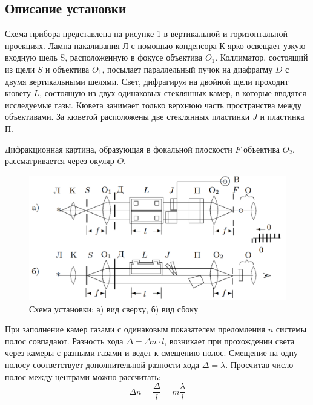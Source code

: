 \documentclass[a4paper,12pt]{article}
\begin{document}
	\subsection{Описание установки}
	Схема прибора представлена на рисунке 1 в вертикальной и горизонтальной проекциях. Лампа накаливания Л с помощью конденсора К ярко освещает узкую входную щель S, расположенную в фокусе объектива $O_1$. Коллиматор, состоящий из щели $S$ и объектива $O_1$, посылает параллельный пучок на диафрагму $D$ с двумя вертикальными щелями. Свет, дифрагируя на двойной щели проходит кювету $L$, состоящую из двух одинаковых стеклянных камер, в которые вводятся исследуемые газы. Кювета занимает только верхнюю часть пространства между объективами. За кюветой расположены две стеклянных пластинки $J$ и пластинка П. 
	
	Дифракционная картина, образующая в фокальной плоскости $F$ объектива $O_2$, рассматривается через окуляр $O$.
	
	\begin{figure}[h!]
		\begin{center}
			\includegraphics[width = \linewidth]{expsc}
			\caption{Схема установки: а) вид сверху, б) вид сбоку}
		\end{center}
	\end{figure}
	
	При заполнение камер газами с одинаковым показателем преломления $n$ системы полос совпадают. Разность хода $\Delta = \Delta n \cdot l$, возникает при прохождении света через камеры с разными газами и ведет к смещению полос. Смещение на одну полосу соответствует дополнительной разности хода $\Delta = \lambda$. Просчитав число полос между центрами можно рассчитать:
	\begin{equation}
	\Delta n = \frac{\Delta}{l} = m\frac{\lambda}{l}
	\end{equation}
	
\end{document}
